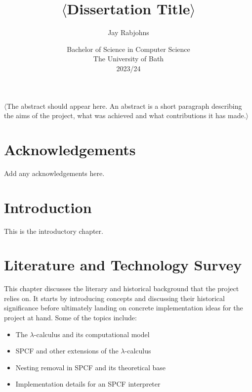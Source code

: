 \documentclass[12pt,a4paper]{report}
\title{\bf $\langle$Dissertation Title$\rangle$}
\author{Jay Rabjohns}
\date{Bachelor of Science in Computer Science\\ 
      The University of Bath\\
      2023/24}
\theoremstyle{definition}
\theoremstyle{remark}
\begin{document}
\hypersetup{pageanchor=false}

\lstset{language=Haskell,breaklines,breakatwhitespace,basicstyle=\small}

\setcounter{page}{0}

\maketitle
\newpage

\newpage

\hypersetup{pageanchor=true}
\abstract
$\langle$The abstract should appear here. An abstract is a short paragraph describing the aims of the project, what was achieved and what contributions it has made.$\rangle$
\newpage

\tableofcontents
\newpage



\chapter*{Acknowledgements}
Add any acknowledgements here.

\newpage
\setcounter{page}{1}
\chapter{Introduction}
This is the introductory chapter.

\chapter{Literature and Technology Survey}
This chapter discusses the literary and historical background that the project relies on. It starts by introducing concepts and discussing their historical significance before ultimately landing on concrete implementation ideas for the project at hand. Some of the topics include:
\begin{itemize}
    \item The $\lambda$-calculus and its computational model
    \item SPCF and other extensions of the $\lambda$-calculus
    \item Nesting removal in SPCF and its theoretical base
    \item Implementation details for an SPCF interpreter
\end{itemize}
\end{document}
